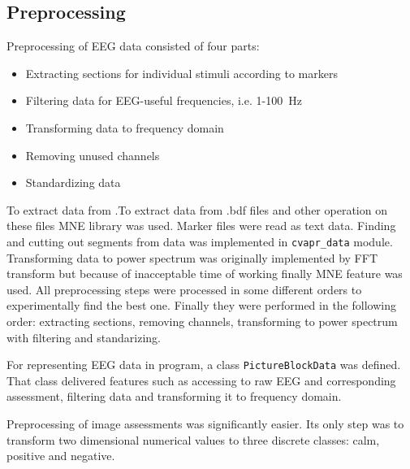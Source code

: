 \documentclass[10pt,journal,compsoc]{IEEEtran}
\begin{document}
\subsection{Preprocessing}
Preprocessing of EEG data consisted of four parts:
\begin{itemize}
\item{Extracting sections for individual stimuli according to markers}
\item{Filtering data for EEG-useful frequencies, i.e. 1-100~Hz}
\item{Transforming data to frequency domain}
\item{Removing unused channels}
\item{Standardizing data}
\end{itemize}

To extract data from .To extract data from .bdf files and other operation on these files MNE library was used. Marker files were read as text data. Finding and cutting out segments from data was implemented in \texttt{cvapr\_data} module. Transforming data to power spectrum was originally implemented by FFT transform but because of inacceptable time of working finally MNE feature was used. All preprocessing steps were processed in some different orders to experimentally find the best one. Finally they were performed in the following order: extracting sections, removing channels, transforming to power spectrum with filtering and standarizing.

For representing EEG data in program, a class \texttt{PictureBlockData} was defined. That class delivered features such as accessing to raw EEG and corresponding assessment, filtering data and transforming it to frequency domain.

Preprocessing of image assessments was significantly easier. Its only step was to transform two dimensional numerical values to three discrete classes: calm, positive and negative.
\end{document}
